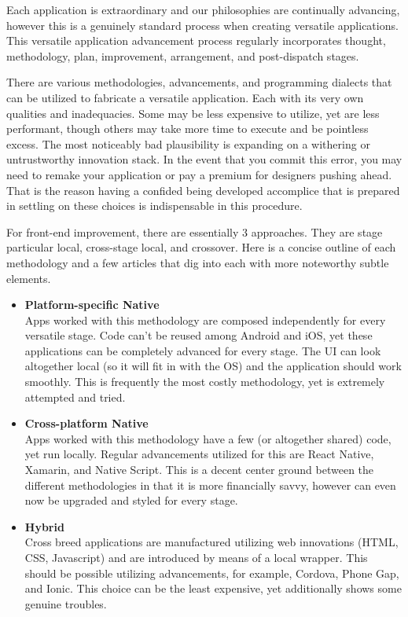 Each application is extraordinary and our philosophies are continually advancing, however this is a genuinely standard process when creating versatile applications. This versatile application advancement process regularly incorporates thought, methodology, plan, improvement, arrangement, and post-dispatch stages.

There are various methodologies, advancements, and programming dialects that can be utilized to fabricate a versatile application. Each with its very own qualities and inadequacies. Some may be less expensive to utilize, yet are less performant, though others may take more time to execute and be pointless excess. The most noticeably bad plausibility is expanding on a withering or untrustworthy innovation stack. In the event that you commit this error, you may need to remake your application or pay a premium for designers pushing ahead. That is the reason having a confided being developed accomplice that is prepared in settling on these choices is indispensable in this procedure.

For front-end improvement, there are essentially 3 approaches. They are stage particular local, cross-stage local, and crossover. Here is a concise outline of each methodology and a few articles that dig into each with more noteworthy subtle elements.

\begin{itemize}
  \item \textbf{Platform-specific Native} \\
  Apps worked with this methodology are composed independently for every versatile stage. Code can't be reused among Android and iOS, yet these applications can be completely advanced for every stage. The UI can look altogether local (so it will fit in with the OS) and the application should work smoothly. This is frequently the most costly methodology, yet is extremely attempted and tried.
  
  \item \textbf{Cross-platform Native} \\ 
  Apps worked with this methodology have a few (or altogether shared) code, yet run locally. Regular advancements utilized for this are React Native, Xamarin, and Native Script. This is a decent center ground between the different methodologies in that it is more financially savvy, however can even now be upgraded and styled for every stage.
  
  \item \textbf{Hybrid} \\
 Cross breed applications are manufactured utilizing web innovations (HTML, CSS, Javascript) and are introduced by means of a local wrapper. This should be possible utilizing advancements, for example, Cordova, Phone Gap, and Ionic. This choice can be the least expensive, yet additionally shows some genuine troubles.
\end{itemize}

